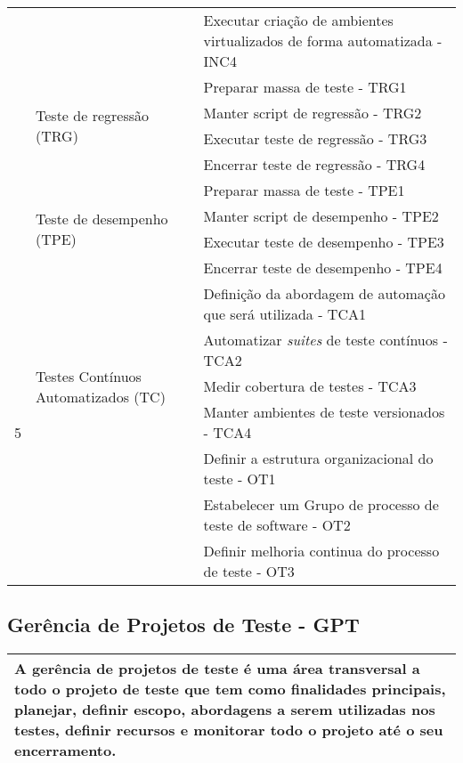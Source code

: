 \begin{table}[H]
{\begin{tabular}{|p{45mm}|p{76mm}|p{100mm}|}
    \cline{3-3}
        & & Executar criação de ambientes virtualizados  de forma automatizada - INC4 \\ 
    \cline{2-3}
        & \multirow{4}{*}{Teste de regressão (TRG)}& 
        Preparar massa de teste - TRG1\\ 
    \cline{3-3}
        & & Manter script de regressão - TRG2\\ 
    \cline{3-3}
        & & Executar teste de regressão - TRG3\\ 
    \cline{3-3}
        & & Encerrar teste de regressão - TRG4\\ 
    \cline{2-3}
        & \multirow{4}{*}{Teste de desempenho (TPE)}& 
        Preparar massa de teste - TPE1\\ 
    \cline{3-3}
        & & Manter script de desempenho - TPE2\\ 
    \cline{3-3}
        & & Executar teste de desempenho - TPE3\\ 
    \cline{3-3}
        & & Encerrar teste de desempenho - TPE4\\ 
    \hline
        \multirow{8}{*}{5}&
        \multirow{5}{*}{Testes Contínuos Automatizados (TC)}&
        Definição da abordagem de automação que será utilizada - TCA1\\ 
    \cline{3-3}
        & & Automatizar \textit{suites} de teste contínuos - TCA2\\
    \cline{3-3}
        & & Medir cobertura de testes - TCA3\\ 
    \cline{3-3}
        & & Manter ambientes de teste versionados - TCA4\\ 
    \cline{2-3}
        & \multirow{3}{*}{Otimização dos Teste (OT)}& 
        Definir a estrutura organizacional do teste - OT1\\
    \cline{3-3}
        & & Estabelecer um Grupo de processo de teste de software - OT2\\ 
    \cline{3-3}
        & & Definir melhoria continua do processo de teste - OT3\\ 
    \hline
    \end{tabular}
}
\end{table}

\subsection{Gerência de Projetos de Teste - GPT}
\label{sec:gerenciadeprojetosdeteste}


\begin{table}[!ht]
\centering
\begin{tabular}{|p{130mm}|}
\hline
A gerência de projetos de teste é uma área transversal a todo o projeto de teste que tem como finalidades principais, planejar, definir escopo, abordagens a serem utilizadas nos testes, definir recursos e monitorar todo o projeto até o seu encerramento.\\
\hline
\end{tabular}
\end{table}

